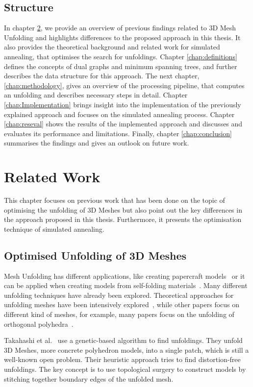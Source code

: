 \documentclass[draft,final]{vutinfth} %
\begin{document}
\section{Structure}
In chapter \ref{chap:relatedwork}, we provide an overview of previous findings related to 3D Mesh Unfolding and highlights differences to the proposed approach in this thesis. It also provides the theoretical background and related work for simulated annealing, that optimises the search for unfoldings. Chapter \ref{chap:definitions} defines the concepts of dual graphs and minimum spanning trees, and further describes the data structure for this approach. The next chapter, \ref{chap:methodology}, gives an overview of the processing pipeline, that computes an unfolding and describes necessary steps in detail. Chapter \ref{chap:Implementation} brings insight into the implementation of the previously explained approach and focuses on the simulated annealing process. Chapter \ref{chap:reseval} shows the results of the implemented approach and discusses and evaluates its performance and limitations. Finally, chapter \ref{chap:conclusion} summarises the findings and gives an outlook on future work.

\chapter{Related Work}
\label{chap:relatedwork}
This chapter focuses on previous work that has been done on the topic of optimising the unfolding of 3D Meshes but also point out the key differences in the approach proposed in this thesis. Furthermore, it presents the optimisation technique of simulated annealing.

\section{Optimised Unfolding of 3D Meshes}
Mesh Unfolding has different applications, like creating papercraft models~\cite{takahashi2011optimized,straubcreating} or it can be applied when creating models from self-folding materials~\cite{felton2013self,tibbits20144d}. Many different unfolding techniques have already been explored. Theoretical approaches for unfolding meshes have been intensively explored~\cite{shephard1975convex}, while other papers focus on different kind of meshes, for example, many papers focus on the unfolding of orthogonal polyhedra~\cite{xi2016learning,damian2007epsilon,damian2014unfolding}.

Takahashi et al.~\cite{takahashi2011optimized} use a genetic-based algorithm to find unfoldings. They unfold 3D Meshes, more concrete polyhedron models, into a single patch, which is still a well-known open problem. Their heuristic approach tries to find distortion-free unfoldings. The key concept is to use topological surgery to construct models by stitching together boundary edges of the unfolded mesh.
\end{document}
